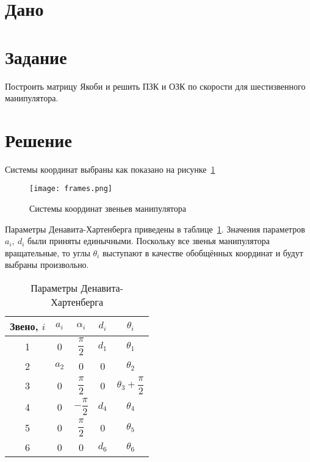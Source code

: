 \documentclass[14pt]{extarticle}
\begin{document}
    

    \section*{Дано}

    \section*{Задание}
    Построить матрицу Якоби и решить ПЗК и ОЗК по скорости для шестизвенного манипулятора.

    \section*{Решение}
    Системы координат выбраны как показано на рисунке~\ref{pic:frames}
    \begin{figure}[H]
        \centering
        \texttt{[image: frames.png]}
        \caption{Системы координат звеньев манипулятора}
        \label{pic:frames}
    \end{figure}

    Параметры Денавита-Хартенберга приведены в таблице~\ref{tbl:params}.
    Значения параметров $a_i,\ d_i$ были приняты единычными. Поскольку все звенья манипулятора
    вращательные, то углы $\theta_i$ выступают в качестве обобщённых координат и будут выбраны произвольно.
    {
    \renewcommand{\arraystretch}{2}
    \begin{table}[H]
        \centering
        \begin{tabular}{*{5}{c}}\toprule
            Звено, $i$  & $a_i$ & $\alpha_i$        & $d_i$ & $\theta_i$ \\ [1ex] \midrule
            1           & 0     & $\dfrac{\pi}{2}$  & $d_1$ & $\theta_1$ \\ [1ex] \midrule
            2           & $a_2$ & 0                 & 0     & $\theta_2$ \\ [1ex] \midrule
            3           & 0     & $\dfrac{\pi}{2}$  & 0     & $\theta_3 + \dfrac{\pi}{2}$ \\ [1ex] \midrule
            4           & 0     & $-\dfrac{\pi}{2}$ & $d_4$ & $\theta_4$ \\ [1ex] \midrule
            5           & 0     & $\dfrac{\pi}{2}$  & 0     & $\theta_5$ \\ [1ex] \midrule
            6           & 0     & 0                 & $d_6$ & $\theta_6$ \\ [1ex]
            \bottomrule
        \end{tabular}
        \caption{Параметры Денавита-Хартенберга}
        \label{tbl:params}
    \end{table}
    }
\end{document}

